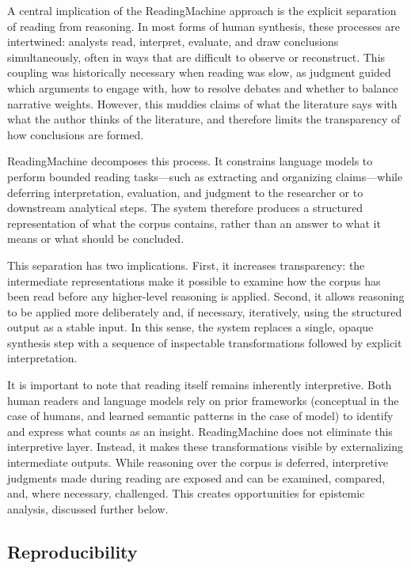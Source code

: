 \documentclass[
  11pt,
]{article}
\begin{document}
A central implication of the ReadingMachine approach is the explicit
separation of reading from reasoning. In most forms of human synthesis,
these processes are intertwined: analysts read, interpret, evaluate, and
draw conclusions simultaneously, often in ways that are difficult to
observe or reconstruct. This coupling was historically necessary when
reading was slow, as judgment guided which arguments to engage with, how
to resolve debates and whether to balance narrative weights. However,
this muddies claims of what the literature says with what the author
thinks of the literature, and therefore limits the transparency of how
conclusions are formed.

ReadingMachine decomposes this process. It constrains language models to
perform bounded reading tasks---such as extracting and organizing
claims---while deferring interpretation, evaluation, and judgment to the
researcher or to downstream analytical steps. The system therefore
produces a structured representation of what the corpus contains, rather
than an answer to what it means or what should be concluded.

This separation has two implications. First, it increases transparency:
the intermediate representations make it possible to examine how the
corpus has been read before any higher-level reasoning is applied.
Second, it allows reasoning to be applied more deliberately and, if
necessary, iteratively, using the structured output as a stable input.
In this sense, the system replaces a single, opaque synthesis step with
a sequence of inspectable transformations followed by explicit
interpretation.

It is important to note that reading itself remains inherently
interpretive. Both human readers and language models rely on prior
frameworks (conceptual in the case of humans, and learned semantic
patterns in the case of model) to identify and express what counts as an
insight. ReadingMachine does not eliminate this interpretive layer.
Instead, it makes these transformations visible by externalizing
intermediate outputs. While reasoning over the corpus is deferred,
interpretive judgments made during reading are exposed and can be
examined, compared, and, where necessary, challenged. This creates
opportunities for epistemic analysis, discussed further below.

\subsection{Reproducibility}\label{reproducibility}
\end{document}
